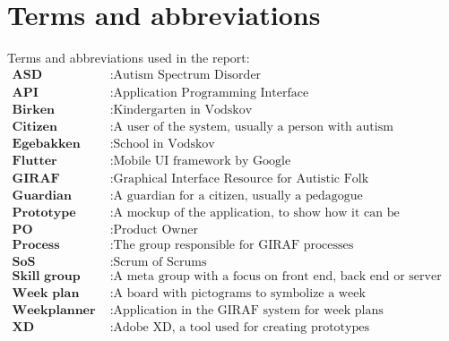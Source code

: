 \chapter*{Terms and abbreviations}
Terms and abbreviations used in the report:
\begin{align*}
    \textbf{ASD} &: \text{Autism Spectrum Disorder} \\
    \textbf{API} &: \text{Application Programming Interface} \\
    \textbf{Birken} &: \text{Kindergarten in Vodskov} \\
    \textbf{Citizen} &: \text{A user of the system, usually a person with autism} \\
    \textbf{Egebakken} &: \text{School in Vodskov} \\
    \textbf{Flutter} &: \text{Mobile UI framework by Google} \\
    \textbf{GIRAF} &: \text{Graphical Interface Resource for Autistic Folk} \\
    \textbf{Guardian} &: \text{A guardian for a citizen, usually a pedagogue} \\
    \textbf{Prototype} &: \text{A mockup of the application, to show how it can be implemented} \\
    \textbf{PO} &: \text{Product Owner} \\
    \textbf{Process group} &: \text{The group responsible for GIRAF processes} \\
    \textbf{SoS} &: \text{Scrum of Scrums} \\
    \textbf{Skill group} &: \text{A meta group with a focus on front end, back end or server} \\
    \textbf{Week plan} &: \text{A board with pictograms to symbolize a week} \\
    \textbf{Weekplanner} &: \text{Application in the GIRAF system for week plans} \\
    \textbf{XD} &: \text{Adobe XD, a tool used for creating prototypes} \\
\end{align*}
